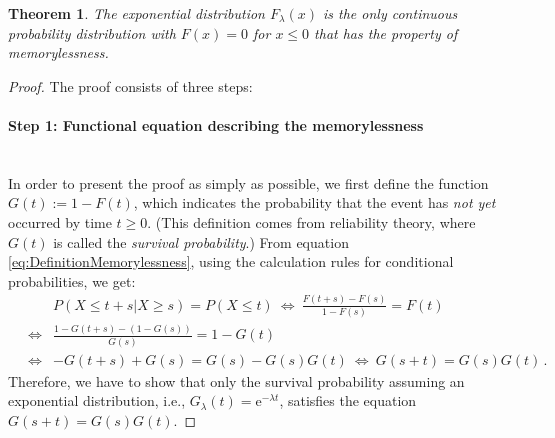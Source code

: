 \documentclass[a4paper,11pt,oneside]{article}
\newtheorem{theorem}{Theorem}
\theoremstyle{definition}
\begin{document}
\begin{theorem}
The exponential distribution $F_\lambda(x)$ is the only \emph{continuous} probability distribution with $F(x)=0$ for $x\le0$ that has the property of memorylessness.
\end{theorem}

\begin{proof}
The proof consists of three steps:

\paragraph{Step 1: Functional equation describing the memorylessness}~\\
In order to present the proof as simply as possible, we first define the function $G(t):=1-F(t)$, which indicates the probability that the event has \emph{not yet} occurred by time $t\ge0$. (This definition comes from reliability theory, where $G(t)$ is called the \emph{survival probability}.) From equation \eqref{eq:DefinitionMemorylessness}, using the calculation rules for conditional probabilities, we get:
\begin{eqnarray*}
~&~&P(X\le t+s | X\ge s)=P(X\le t)
~\iff~\frac{F(t+s)-F(s)}{1-F(s)}=F(t)\\
~&\iff&\frac{1-G(t+s)-(1-G(s))}{G(s)}=1-G(t)\\
~&\iff&-G(t+s)+G(s)=G(s)-G(s)G(t)
~\iff~G(s+t)=G(s)G(t)\,.
\end{eqnarray*}
Therefore, we have to show that only the survival probability assuming an exponential distribution, i.e., $G_\lambda(t)=\mathrm{e}^{-\lambda t}$, satisfies the equation $G(s+t)=G(s)G(t)$.


\end{proof}
\end{document}
